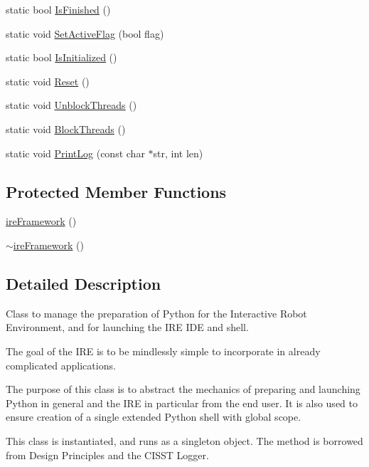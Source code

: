 \begin{DoxyCompactItemize}
\item 
static bool \hyperlink{classire_framework_aca836de894736d5e77cea1c6aaedfef5}{Is\-Finished} ()
\item 
static void \hyperlink{classire_framework_a309c6b989cf90fa50dd48f6ca0532cba}{Set\-Active\-Flag} (bool flag)
\item 
static bool \hyperlink{classire_framework_a7ab5891c373df535e295de09fa35d83f}{Is\-Initialized} ()
\item 
static void \hyperlink{classire_framework_a18ebff7b6ec518691c58963fcc0d2d28}{Reset} ()
\item 
static void \hyperlink{classire_framework_ac85895cffa08cc252259b9ab3e896b4d}{Unblock\-Threads} ()
\item 
static void \hyperlink{classire_framework_a3660a5a27d46361e369b2bdc1a596ec4}{Block\-Threads} ()
\item 
static void \hyperlink{classire_framework_a003bbae61193a9a61849b861039d0e89}{Print\-Log} (const char $\ast$str, int len)
\end{DoxyCompactItemize}
\subsection*{Protected Member Functions}
\begin{DoxyCompactItemize}
\item 
\hyperlink{classire_framework_abeb6527e0593ce83c0d8806debb4482d}{ire\-Framework} ()
\item 
\hyperlink{classire_framework_a11255dbb105b457dd65923fde9385e5c}{$\sim$ire\-Framework} ()
\end{DoxyCompactItemize}


\subsection{Detailed Description}
Class to manage the preparation of Python for the Interactive Robot Environment, and for launching the I\-R\-E I\-D\-E and shell. 

The goal of the I\-R\-E is to be mindlessly simple to incorporate in already complicated applications.

The purpose of this class is to abstract the mechanics of preparing and launching Python in general and the I\-R\-E in particular from the end user. It is also used to ensure creation of a single extended Python shell with global scope.

This class is instantiated, and runs as a singleton object. The method is borrowed from Design Principles and the C\-I\-S\-S\-T Logger.

